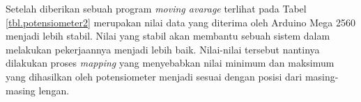 \begin{table}[H]
	\centering
	\caption{Hasil Pengujian Potensiometer Menggunakan Program \textit{Moving Avarage}}
	\label{tbl.potensiometer2}
	
\end{table} 


Setelah diberikan sebuah program \textit{moving avarage} terlihat pada Tabel \ref{tbl.potensiometer2} merupakan nilai data yang diterima oleh Arduino Mega 2560 menjadi lebih stabil. Nilai yang stabil akan membantu sebuah sistem dalam melakukan pekerjaannya menjadi lebih baik. Nilai-nilai tersebut nantinya dilakukan proses \textit{mapping} yang menyebabkan nilai minimum dan maksimum yang dihasilkan oleh potensiometer menjadi sesuai dengan posisi dari masing-masing lengan.

